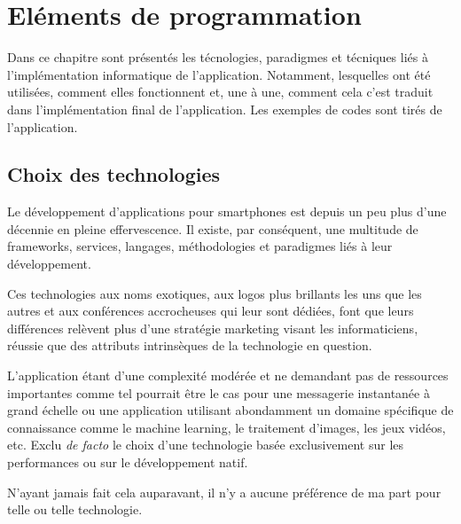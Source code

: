 
\chapter[Eléments de programmation]{Eléments de programmation}
    Dans ce chapitre sont présentés les técnologies, paradigmes et técniques liés à l'implémentation
    informatique de l'application. Notamment, lesquelles ont été utilisées, comment elles fonctionnent et, une à une, comment cela 
    c'est traduit dans l'implémentation final de l'application. Les exemples de codes sont tirés de l'application.

    \section{Choix des technologies}
    Le développement d'applications
    pour smartphones est depuis un peu plus d'une décennie en pleine effervescence. Il existe, par 
    conséquent, une multitude de frameworks, services, langages, méthodologies et paradigmes liés à leur
    développement.

    Ces technologies aux noms exotiques, aux logos plus brillants les uns que les autres et aux 
    conférences accrocheuses qui leur sont dédiées, font que leurs différences relèvent plus
    d'une stratégie marketing visant les informaticiens, réussie que des attributs
    intrinsèques de la technologie en question. 

    L'application étant d'une complexité modérée et ne demandant pas de ressources importantes
    comme tel pourrait être le cas pour une messagerie instantanée à grand échelle ou une application
    utilisant abondamment un domaine spécifique de connaissance comme le machine learning, le traitement d'images, les jeux vidéos, etc.
    Exclu \textit{de facto} le choix d'une technologie basée exclusivement sur les performances ou sur le développement natif.

    N'ayant jamais fait cela auparavant, il n'y a aucune préférence de ma part pour telle ou telle technologie.

